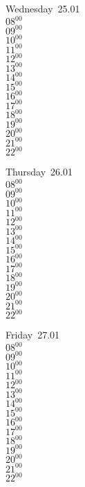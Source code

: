 \documentclass[11pt,a4paper]{book}\usepackage[]{graphicx}\usepackage[]{color}
\begin{document}
\begin{weekdaybox}
  Wednesday~25.01\\
  { 
  \vfill
  $08^{00}$\\
$09^{00}$\\
$10^{00}$\\
$11^{00}$\\
$12^{00}$\\
$13^{00}$\\
$14^{00}$\\
$15^{00}$\\
$16^{00}$\\
$17^{00}$\\
$18^{00}$\\
$19^{00}$\\
$20^{00}$\\
$21^{00}$\\
$22^{00}$\\
  }
\end{weekdaybox}
\clearpage
\begin{headerbox}
\end{headerbox}
\begin{weekdaybox}
  Thursday~26.01\\
  { 
  \vfill
  $08^{00}$\\
$09^{00}$\\
$10^{00}$\\
$11^{00}$\\
$12^{00}$\\
$13^{00}$\\
$14^{00}$\\
$15^{00}$\\
$16^{00}$\\
$17^{00}$\\
$18^{00}$\\
$19^{00}$\\
$20^{00}$\\
$21^{00}$\\
$22^{00}$\\
  }
\end{weekdaybox} 
\begin{weekdaybox}
  Friday~27.01\\
  { 
  \vfill
  $08^{00}$\\
$09^{00}$\\
$10^{00}$\\
$11^{00}$\\
$12^{00}$\\
$13^{00}$\\
$14^{00}$\\
$15^{00}$\\
$16^{00}$\\
$17^{00}$\\
$18^{00}$\\
$19^{00}$\\
$20^{00}$\\
$21^{00}$\\
$22^{00}$\\
  }
\end{weekdaybox}
\end{document}
